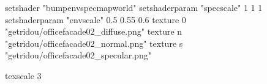 setshader "bumpenvspecmapworld"
setshaderparam "specscale" 1 1 1
setshaderparam "envscale"  0.5 0.55 0.6
    texture 0 "getridou/officefacade02_diffuse.png"
    texture n "getridou/officefacade02_normal.png"
    texture s "getridou/officefacade02_specular.png"

texscale 3
